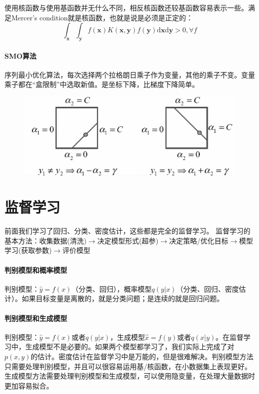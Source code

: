 使用核函数与使用基函数并无什么不同，相反核函数还较基函数容易表示一些。满足Mercer's condition就是核函数，也就是说是必须是正定的：
$$\int_{\bm x}\int_{\bm y}f(\bm x)K(\bm x, \bm y)f(\bm y)\mathrm{d}\bm x\mathrm{d}\bm y > 0, \forall f$$

\paragraph{SMO算法}
序列最小优化算法，每次选择两个拉格朗日乘子作为变量，其他的乘子不变。变量乘子都在“盒限制”中选取新值。是坐标下降，比梯度下降简单。

\begin{figure}[H]
    \centering
\includegraphics[width=0.7\columnwidth]{smo.png}
\end{figure}

\section{监督学习}
前面我们学习了回归、分类、密度估计，这些都是完全的监督学习。
监督学习的基本方法：收集数据(清洗)$\rightarrow$决定模型形式(超参)$\rightarrow$决定策略/优化目标$\rightarrow$模型学习(获取参数)$\rightarrow$评价模型

\paragraph{判别模型和概率模型}
判别模型：$\hat{y} = f(x)$（分类、回归），概率模型$q(y|x)$（分类、回归、密度估计）。如果目标变量是离散的，就是分类问题；是连续的就是回归问题。

\paragraph{判别模型和生成模型}
判别模型：$\hat{y} = f(x)$或者$q(y|x)$，生成模型$\hat{x} = f(y)$或者$q(x|y)$。在监督学习中，生成模型不是必要的。如果两个模型都学习了，我们实际上完成了对$p(x,y)$的估计。密度估计在监督学习中是万能的，但是很难解决。判别模型方法只需要处理判别模型，并且可以很容易运用基/核函数，在小数据集上表现更好。生成模型方法需要处理判别模型和生成模型，可以使用隐变量，在处理大量数据时更加容易拟合。

